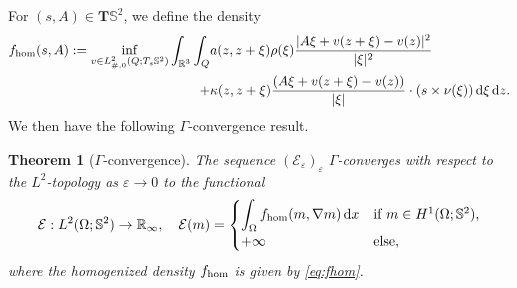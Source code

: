 \documentclass[reqno,11pt]{amsart}
\numberwithin{equation}{section}
\theoremstyle{thmlemcorr}
\newtheorem{theorem}{Theorem}
\numberwithin{theorem}{section}
\theoremstyle{thmlemcorr*}
\theoremstyle{defi}
\theoremstyle{remexample}
\theoremstyle{ass}
\newcommand{\R}{\mathbb{R}}
\renewcommand{\S}{\mathbb{S}}
\newcommand{\Ecal}{\mathcal{E}}
\renewcommand{\epsilon}{\varepsilon}
\newcommand{\dd}{\,\mathrm{d}}
\newcommand{\1}{\mathds{1}}
\begin{document}
For $(s,A)\in \mathbf{T}\S^2$, we define the density
\begin{align}
\begin{split}\label{eq:fhom}
f_{\rm hom}(s,A) := \inf_{v \in L^2_{\#,0}(Q;T_s \S^2)}\int_{\R^3} \int_{ Q}&a(z,z+\xi)\rho(\xi)\frac{|A\xi +v(z+\xi)-v(z)|^2}{|\xi|^2}\\
+&\kappa(z,z+\xi)\frac{(A\xi+v(z+\xi)-v(z))}{|\xi|} \cdot(s \times \nu(\xi)) \dd \xi\dd z.
\end{split}
\end{align}
We then have the following $\Gamma$-convergence result.
\begin{theorem}[$\Gamma$-convergence] \label{th:Gammalimit}
The sequence $(\Ecal_\epsilon)_\epsilon$ $\Gamma$-converges with respect to the $L^2$-topology as $\epsilon \to 0$ to the functional
\[
\Ecal:L^2(\Omega;\S^2) \to \R_{\infty}, \quad \Ecal(m)=\begin{cases}
    \displaystyle \int_{\Omega}f_{\rm hom}(m,\nabla m)\dd x &\text{if $m \in H^1(\Omega;\S^2)$,}\\
    +\infty &\text{else},
\end{cases}
\]
where the homogenized density $f_{\rm hom}$ is given by \eqref{eq:fhom}. 
\end{theorem}
\end{document}
